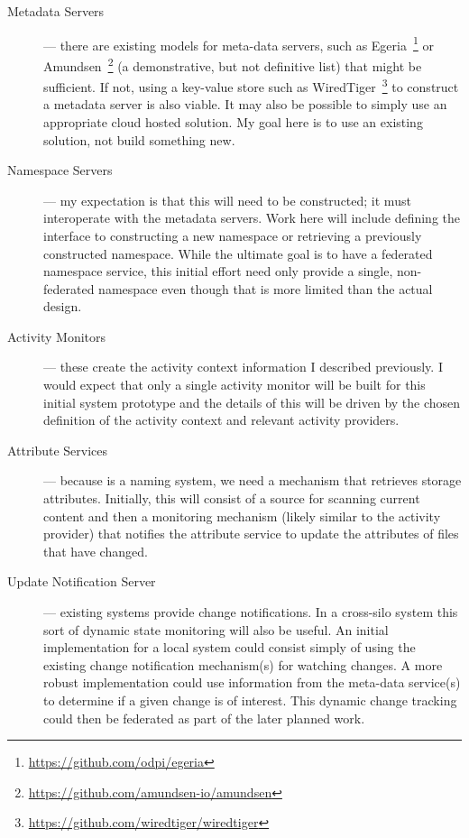 \begin{description}
    \item[Metadata Servers] --- there are existing models for meta-data servers,
        such as Egeria~\footnote{\url{https://github.com/odpi/egeria}} or
        Amundsen~\footnote{\url{https://github.com/amundsen-io/amundsen}} (a
        demonstrative, but not definitive list) that might be sufficient. If
        not, using a key-value store such as
        WiredTiger~\footnote{\url{https://github.com/wiredtiger/wiredtiger}} to
        construct a metadata server is also viable. It may also be possible to
        simply use an appropriate cloud hosted solution.  My goal here is to use
        an existing solution, not build something new.

    \item[Namespace Servers] --- my expectation is that this will need to be
        constructed; it must interoperate with the metadata servers.  Work here will
        include defining the interface to constructing a new namespace or retrieving
        a previously constructed namespace. While the ultimate goal is to have a
        federated namespace service, this initial effort need only provide a single,
        non-federated namespace even though that is more limited than the actual
        design.

    \item[Activity Monitors] --- these create the activity context information I
        described previously.  I would expect that only a single activity monitor
        will be built for this initial system prototype and the details of this will
        be driven by the chosen definition of the activity context and relevant
        activity providers.

    \item[Attribute Services] --- because \system is a naming system, we need a
        mechanism that retrieves storage attributes. Initially, this will consist of
        a source for scanning current content and then a monitoring mechanism
        (likely similar to the activity provider) that notifies the attribute
        service to update the attributes of files that have changed.

    \item[Update Notification Server] --- existing systems provide change
        notifications.  In a cross-silo system this sort of dynamic state monitoring
        will also be useful.  An initial implementation for a local system could
        consist simply of using the existing change notification mechanism(s) for
        watching changes.  A more robust implementation could use information from
        the meta-data service(s) to determine if a given change is of interest.
        This dynamic change tracking could then be federated as part of the later
        planned work.
\end{description}

